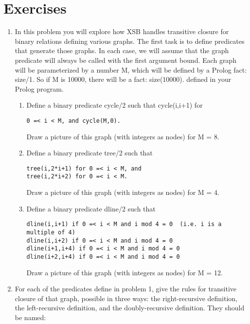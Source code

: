 \section{Exercises}

\begin{enumerate}

\item
In this problem you will explore how XSB handles transitive closure
for binary relations defining various graphs.  The first task is to
define predicates that generate those graphs.  In each case, we will
assume that the graph predicate will always be called with the first
argument bound.  Each graph will be parameterized by a number M, which
will be defined by a Prolog fact: size/1.  So if M is 10000, there
will be a fact:
size(10000).
defined in your Prolog program.

\begin{enumerate}

\item
Define a binary predicate cycle/2 such that cycle(i,i+1) for 
\begin{verbatim}
0 =< i < M, and cycle(M,0).
\end{verbatim}
Draw a picture of this graph (with integers as nodes) for M = 8.

\item
Define a binary predicate tree/2 such that 
\begin{verbatim}
tree(i,2*i+1) for 0 =< i < M, and
tree(i,2*i+2) for 0 =< i < M.
\end{verbatim}
Draw a picture of this graph (with integers as nodes) for M = 4.

\item
Define a binary predicate dline/2 such that
\begin{verbatim}
dline(i,i+1) if 0 =< i < M and i mod 4 = 0  (i.e. i is a multiple of 4)
dline(i,i+2) if 0 =< i < M and i mod 4 = 0
dline(i+1,i+4) if 0 =< i < M and i mod 4 = 0
dline(i+2,i+4) if 0 =< i < M and i mod 4 = 0
\end{verbatim}
Draw a picture of this graph (with integers as nodes) for M = 12.
\end{enumerate}

\item
For each of the predicates define in problem 1, give the rules for
transitive closure of that graph, possible in three ways: the
right-recursive definition, the left-recursive definition, and the
doubly-recursive definition.  They should be named:


\end{enumerate}
